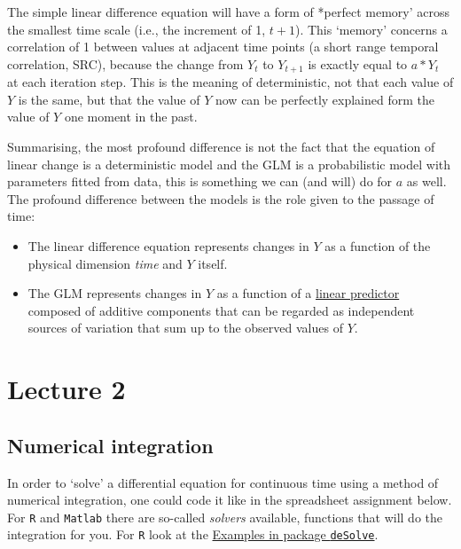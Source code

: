 \documentclass[]{book}
\providecommand{\tightlist}{%
  \setlength{\itemsep}{0pt}\setlength{\parskip}{0pt}}
\let\stdsection\section
\renewcommand\section{\newpage\stdsection}
\begin{document}
The simple linear difference equation will have a form of *perfect
memory' across the smallest time scale (i.e., the increment of 1,
\(t+1\)). This `memory' concerns a correlation of 1 between values at
adjacent time points (a short range temporal correlation, SRC), because
the change from \(Y_t\) to \(Y_{t+1}\) is exactly equal to \(a * Y_t\)
at each iteration step. This is the meaning of deterministic, not that
each value of \(Y\) is the same, but that the value of \(Y\) now can be
perfectly explained form the value of \(Y\) one moment in the past.

Summarising, the most profound difference is not the fact that the
equation of linear change is a deterministic model and the GLM is a
probabilistic model with parameters fitted from data, this is something
we can (and will) do for \(a\) as well. The profound difference between
the models is the role given to the passage of time:

\begin{itemize}
\tightlist
\item
  The linear difference equation represents changes in \(Y\) as a
  function of the physical dimension \emph{time} and \(Y\) itself.
\item
  The GLM represents changes in \(Y\) as a function of a
  \href{https://en.wikipedia.org/wiki/Linear_predictor_function}{linear
  predictor} composed of additive components that can be regarded as
  independent sources of variation that sum up to the observed values of
  \(Y\).
\end{itemize}

\chapter*{Lecture 2}\label{lecture-2}

\section*{Numerical integration}\label{numerical-integration}

In order to `solve' a differential equation for continuous time using a
method of numerical integration, one could code it like in the
spreadsheet assignment below. For \texttt{R} and \texttt{Matlab} there
are so-called \emph{solvers} available, functions that will do the
integration for you. For \texttt{R} look at the
\href{http://desolve.r-forge.r-project.org}{Examples in package
\texttt{deSolve}}.
\end{document}
